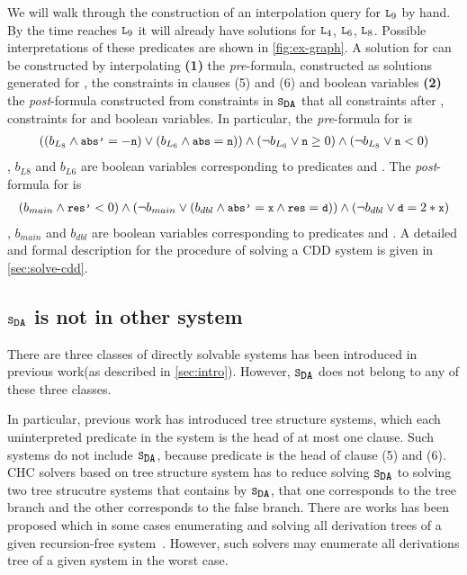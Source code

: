 We will walk through the construction of an interpolation query for
$\cc{L}_9$ by hand.  By the time \sys reaches $\cc{L}_9$ it will
already have solutions for $\cc{L}_4$, $\cc{L}_6$, $\cc{L}_8$.
Possible interpretations of these predicates are shown in
\autoref{fig:ex-graph}.
%
A solution for  can be constructed by interpolating \textbf{(1)}
the \emph{pre}-formula, constructed as solutions generated for , 
the constraints in clauses (5) and (6) and boolean variables%
\textbf{(2)} the \emph{post}-formula constructed from constraints in
$\mcchc$ that all constraints after , constraints for 
and boolean variables.
%
In particular, the \emph{pre}-formula for  is 
\begin{gather}
  ((b_{L_8}\land \cc{abs'}= -\cc{n})
    \lor (b_{L_6} \land \cc{abs}=\cc{n}))
  \land (\neg b_{L_6} \lor \cc{n} \ge 0)
    \land (\neg b_{L_8} \lor \cc{n}<0)
\end{gather}
%
, $b_{L8}$ and $b_{L6}$ are boolean variables corresponding to predicates  and .
%
The \emph{post}-formula for  is
\begin{gather}
  (b_{main} \land \cc{res'} < 0 )
    \land (\neg b_{main} \lor (b_{dbl} \land \cc{abs'}= \cc{x} \land \cc{res}=\cc{d} ))
  \land (\neg b_{dbl} \lor \cc{d} = 2*\cc{x})
\end{gather}
, $b_{main}$ and $b_{dbl}$ are boolean variables corresponding to
predicates  and .
%
A detailed and formal description for the procedure of solving a CDD system is given in
\autoref{sec:solve-cdd}.


\subsection{$\mcchc$ is not in other system}
\label{sec:not-in}
%
There are three classes of directly solvable systems has been introduced
in previous work(as described in \autoref{sec:intro}).
%
However, $\mcchc$ does not belong to any of these three classes.
%

In particular, previous work has introduced tree structure systems\cite{bjorner13,heizmann10},
which each uninterpreted predicate in the system is the head of at most one clause.
%
Such systems do not include $\mcchc$, because predicate  is the head 
of clause (5) and (6).
%
CHC solvers based on tree structure system has to reduce solving $\mcchc$ to
solving two tree strucutre systems that contains by $\mcchc$, that one corresponds
to the tree branch and the other corresponds to the false branch.
There are works has been proposed which in some cases enumerating 
and solving all derivation trees 
of a given recursion-free
system~\cite{mcmillan14}.
%
However, such solvers may enumerate all derivations tree of a given system
in the worst case.

